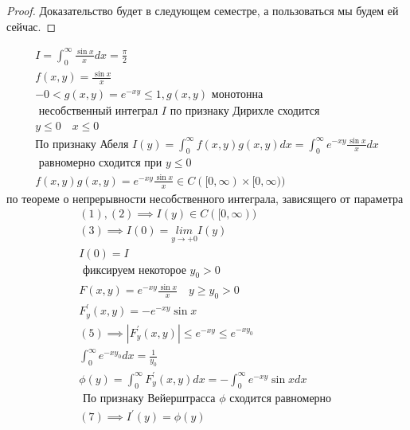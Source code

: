 \documentclass[main]{subfiles}
\begin{document}
     \begin{proof}
          Доказательство будет в следующем семестре, а пользоваться мы будем ей сейчас.
     \end{proof}
     \begin{example}
          \begin{gather*}
               I = \int^\infty_0 \frac{\sin x}{x} dx = \frac{\pi}{2} \\
               f(x,y) = \frac{\sin x}{x} \\
              -0 < g(x,y) = e^{-xy} \leq 1, g(x,y) \text{ монотонна } \\
               \text{  несобственный интеграл }I \text{ по признаку Дирихле сходится} \\
               y \leq 0 \quad x \leq 0 \\ 
               \text{По признаку Абеля }
                I(y) = \int^\infty_0 f(x,y)g(x,y)dx = \int^\infty_0 e^{-xy} \frac{\sin x}{x}dx \\
                \text{ равномерно сходится при } y \leq 0 \\
               f(x,y)g(x,y) = e^{-xy} \frac{\sin x}{x} \in C([0,\infty) \times [0,\infty) ) \tag{2} \end{gather*}
          по теореме о непрерывности несобственного интеграла, зависящего от параметра
          \begin{gather*}
               (1),(2) \implies I(y) \in C([0,\infty)) \tag{3}\\
               (3) \implies I(0) = \underset{y \to +0}{lim} I(y) \tag{4}\\
               I(0) = I \\
               \text{ фиксируем некоторое } y_0 > 0\\
               F(x,y) = e^{-xy} \frac{\sin x}{x} \quad y \geq y_0 > 0 \\
               F^\prime_y(x,y) = -e^{-xy} \sin x \tag{5} \\
               (5) \implies |F^\prime_y(x,y)| \leq e^{-xy} \leq e^{-xy_0} \tag{6} \\
               \int^\infty_0 e^{-xy_0} dx = \frac{1}{y_0} \\
               \phi(y) = \int^\infty_0 F^\prime_y(x,y) dx = -\int^\infty_0 e^{-xy} \sin x dx \tag{7}\\
               \text{ По признаку Вейерштрасса } \phi \text{ сходится равномерно } \\
               (7) \implies I^\prime(y) = \phi(y) \tag{8} \\

\end{gather*}
\end{example}
\end{document}

